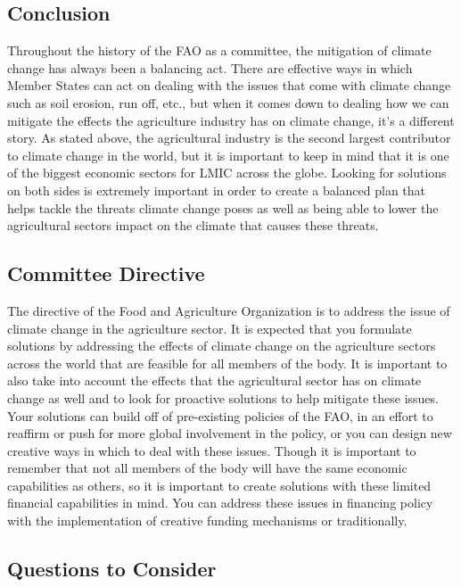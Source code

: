 \documentclass[10pt, letterpaper]{article}
\begin{document}
\subsection{Conclusion}

Throughout the history of the FAO as a committee, the mitigation of
climate change has always been a balancing act. There are effective ways
in which Member States can act on dealing with the issues that come with
climate change such as soil erosion, run off, etc., but when it comes
down to dealing how we can mitigate the effects the agriculture industry
has on climate change, it's a different story. As stated above, the
agricultural industry is the second largest contributor to climate
change in the world, but it is important to keep in mind that it is one
of the biggest economic sectors for LMIC across the globe. Looking for
solutions on both sides is extremely important in order to create a
balanced plan that helps tackle the threats climate change poses as well
as being able to lower the agricultural sectors impact on the climate
that causes these threats. \\

\subsection{Committee Directive}

The directive of the Food and Agriculture Organization is to address the
issue of climate change in the agriculture sector. It is expected that
you formulate solutions by addressing the effects of climate change on
the agriculture sectors across the world that are feasible for all
members of the body. It is important to also take into account the
effects that the agricultural sector has on climate change as well and
to look for proactive solutions to help mitigate these issues. Your
solutions can build off of pre-existing policies of the FAO, in an
effort to reaffirm or push for more global involvement in the policy, or
you can design new creative ways in which to deal with these issues.
Though it is important to remember that not all members of the body will
have the same economic capabilities as others, so it is important to
create solutions with these limited financial capabilities in mind. You
can address these issues in financing policy with the implementation of
creative funding mechanisms or traditionally. \\

\subsection{Questions to Consider}
\end{document}
